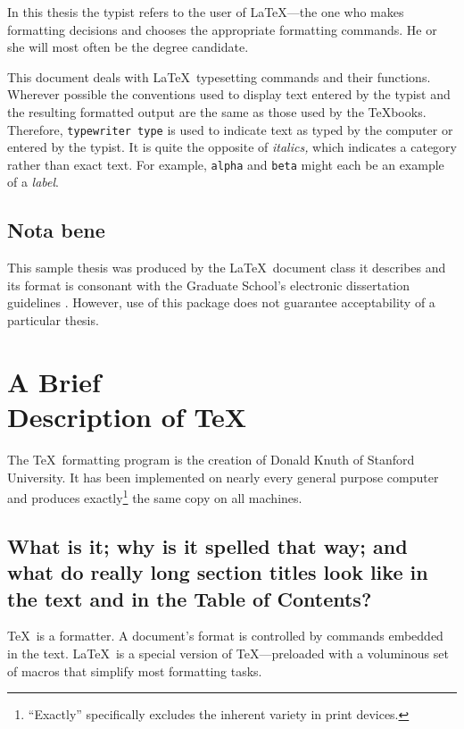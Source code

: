 \documentclass [11pt, twoside] {uwthesis}[2020/02/24]
\begin{document}
In this thesis the typist
refers to the user of \LaTeX---the one who
makes formatting decisions and chooses the appropriate
formatting commands.
He or she will most often be the degree candidate.
 
This document deals with \LaTeX\ typesetting commands and their
functions.  Wherever possible the conventions used to display
text entered by the typist and the resulting formatted output
are the same as those used by the \TeX books.
Therefore, {\tt typewriter type} is used to indicate text
as typed by the computer
or entered by the typist.
It is quite the opposite of {\it italics,} which indicates
a category rather than exact text.  For example,
{\tt alpha} and {\tt beta} might each be an example of a {\it label}.
 
 
\section{Nota bene}
 
This sample thesis was produced by the \LaTeX\ document class it describes
and its format is consonant with the Graduate School's electronic dissertation guidelines%
\cite{SP}.
However, use of this package does not guarantee acceptability
of a particular thesis.
 

 
\chapter{A Brief \\ Description of \protect\TeX}
 
The \TeX\ formatting program is the creation of
Donald Knuth of Stanford University.
It has been implemented on nearly every general purpose computer and
produces exactly\footnote{``Exactly'' specifically excludes the
  inherent variety in print devices.}
the same copy on all machines.
 
\section{What is it; why is it spelled that way; 
and what do
really long section titles look like in the text and in the
Table of Contents?}
 
\TeX\ is a formatter.  A document's format is controlled
by commands embedded in the text.
\LaTeX\ is a special version of \TeX---preloaded
with a voluminous set of macros that simplify most
formatting tasks.
 
\end{document}

